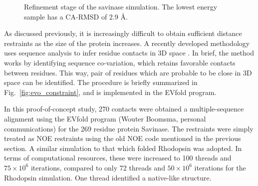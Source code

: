 \begin{figure}%
    \centering
    \caption{Refinement stage of the savinase simulation. The lowest energy sample has a CA-RMSD of 2.9 \AA. }
    \label{fig:savinase_fold}%
\end{figure}


As discussed previously, it is increasingly difficult to obtain sufficient distance restraints as the size of the protein increases.
A recently developed methodology uses sequence analysis to infer residue contacts in 3D space \cite{evfold}.
In brief, the method works by identifying sequence co-variation, which retains favorable contacts between residues.
This way, pair of residues which are probable to be close in 3D space can be identified.
The procedure is briefly summarized in Fig.~\ref{fig:evo_constraint}, and is implemented in the EVfold program.

In this proof-of-concept study, 270 contacts were obtained a multiple-sequence alignment using the EVfold program (Wouter Boomsma, personal communications) for the 269 residue protein Savinase.
The restraints were simply treated as NOE restraints using the old NOE code mentioned in the previous section.
A similar simulation to that which folded Rhodopsin was adopted. 
In terms of computational resources, these were increased to 100 threads and $75 \times 10^6$ iterations, compared to only 72 threads and $50 \times 10^6$ iterations for the Rhodopsin simulation.
One thread identified a native-like structure.

